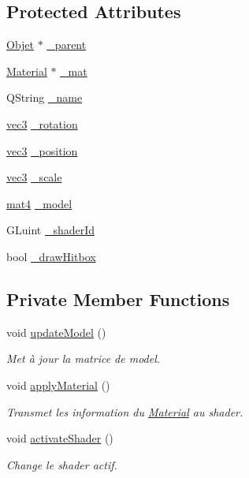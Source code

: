 \subsection*{Protected Attributes}
\begin{DoxyCompactItemize}
\item 
\hyperlink{class_objet}{Objet} $\ast$ \hyperlink{class_objet_a91c5a50011c3fe9233a645aa767a275f}{\+\_\+parent}
\item 
\hyperlink{class_material}{Material} $\ast$ \hyperlink{class_objet_aefea82be8c63504190ac63d5e44ff61a}{\+\_\+mat}
\item 
Q\+String \hyperlink{class_objet_ac19f568a794dd9387386ee71914a868e}{\+\_\+name}
\item 
\hyperlink{structvec3}{vec3} \hyperlink{class_objet_a1d8675e88cc98ba740292af1421c2ee1}{\+\_\+rotation}
\item 
\hyperlink{structvec3}{vec3} \hyperlink{class_objet_a6c1a10fa5f4c5cd0e0617d93f42d927b}{\+\_\+position}
\item 
\hyperlink{structvec3}{vec3} \hyperlink{class_objet_a3fee0c5016edddf7c4b9a0b55ef44752}{\+\_\+scale}
\item 
\hyperlink{structmat4}{mat4} \hyperlink{class_objet_a1963cca59f62c7a6f69a9c2c461ad9ea}{\+\_\+model}
\item 
G\+Luint \hyperlink{class_objet_af0d545a506dbfa377c8ca5a499fdf755}{\+\_\+shader\+Id}
\item 
bool \hyperlink{class_objet_a953ad7ff9941575d1f18b6d256d2dcdc}{\+\_\+draw\+Hitbox}
\end{DoxyCompactItemize}
\subsection*{Private Member Functions}
\begin{DoxyCompactItemize}
\item 
void \hyperlink{class_objet_a0960722f5ddb16f2c245dca4e6584f25}{update\+Model} ()
\begin{DoxyCompactList}\small\item\em Met à jour la matrice de model. \end{DoxyCompactList}\item 
void \hyperlink{class_objet_a5c21e68142ae5b7c880cbd80336fb43e}{apply\+Material} ()
\begin{DoxyCompactList}\small\item\em Transmet les information du \hyperlink{class_material}{Material} au shader. \end{DoxyCompactList}\item 
void \hyperlink{class_objet_a995e953fb2f3d1a472aa04d2c5848f0a}{activate\+Shader} ()
\begin{DoxyCompactList}\small\item\em Change le shader actif. \end{DoxyCompactList}\end{DoxyCompactItemize}


